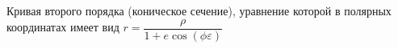 Кривая второго порядка (коническое сечение), уравнение которой в полярных координатах имеет вид $r=\dfrac{\rho}{1+e\cos(\phi\varepsilon)}$
